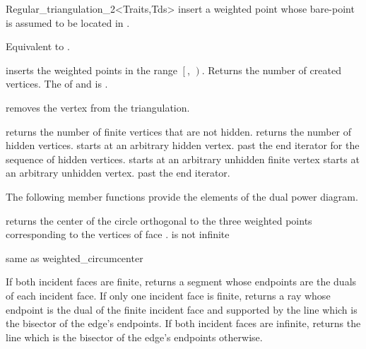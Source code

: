 \begin{ccRefClass}{Regular_triangulation_2<Traits,Tds>}
{insert a weighted point  whose bare-point is assumed to be
located in  .}

{Equivalent to .}

{inserts the weighted points in the range
 $\left[\right.$, $\left.\right)$.
 Returns the number of created vertices.
 \ccPrecond The  of  and 
 is .}

{removes the vertex from the triangulation.}


{returns the number of finite vertices that are not hidden.}
\ccGlue
{}
{returns the number of hidden vertices.}
\ccGlue
{}
{starts at an arbitrary hidden vertex.}
\ccGlue
{}
{past the end iterator for the sequence of hidden vertices.}
\ccGlue
{}
{starts at an arbitrary unhidden finite vertex}
\ccGlue
{}
\ccGlue
{}
{starts at an arbitrary unhidden vertex.}
\ccGlue
{}
{past the end iterator.}

The following member functions provide the elements of the
dual power diagram.

{returns the center of the circle orthogonal to the three weighted
points corresponding to the vertices of face .
\ccPrecond {} is not infinite}

{same as weighted\_circumcenter}

{If both incident faces are finite, returns a segment whose endpoints are the
duals of each incident face. If only one incident face is finite, returns a
ray whose endpoint is the dual of the finite incident face and supported by
the line which is the bisector of the edge's endpoints. If both incident faces
are infinite, returns the line which is the bisector of the edge's endpoints
otherwise.  }


\end{ccRefClass}

